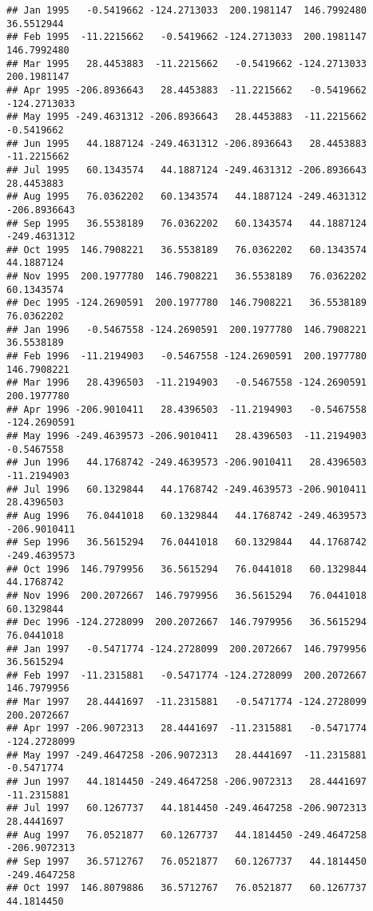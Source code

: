 \documentclass[]{article}
\begin{document}
\begin{verbatim}
## Jan 1995   -0.5419662 -124.2713033  200.1981147  146.7992480   36.5512944
## Feb 1995  -11.2215662   -0.5419662 -124.2713033  200.1981147  146.7992480
## Mar 1995   28.4453883  -11.2215662   -0.5419662 -124.2713033  200.1981147
## Apr 1995 -206.8936643   28.4453883  -11.2215662   -0.5419662 -124.2713033
## May 1995 -249.4631312 -206.8936643   28.4453883  -11.2215662   -0.5419662
## Jun 1995   44.1887124 -249.4631312 -206.8936643   28.4453883  -11.2215662
## Jul 1995   60.1343574   44.1887124 -249.4631312 -206.8936643   28.4453883
## Aug 1995   76.0362202   60.1343574   44.1887124 -249.4631312 -206.8936643
## Sep 1995   36.5538189   76.0362202   60.1343574   44.1887124 -249.4631312
## Oct 1995  146.7908221   36.5538189   76.0362202   60.1343574   44.1887124
## Nov 1995  200.1977780  146.7908221   36.5538189   76.0362202   60.1343574
## Dec 1995 -124.2690591  200.1977780  146.7908221   36.5538189   76.0362202
## Jan 1996   -0.5467558 -124.2690591  200.1977780  146.7908221   36.5538189
## Feb 1996  -11.2194903   -0.5467558 -124.2690591  200.1977780  146.7908221
## Mar 1996   28.4396503  -11.2194903   -0.5467558 -124.2690591  200.1977780
## Apr 1996 -206.9010411   28.4396503  -11.2194903   -0.5467558 -124.2690591
## May 1996 -249.4639573 -206.9010411   28.4396503  -11.2194903   -0.5467558
## Jun 1996   44.1768742 -249.4639573 -206.9010411   28.4396503  -11.2194903
## Jul 1996   60.1329844   44.1768742 -249.4639573 -206.9010411   28.4396503
## Aug 1996   76.0441018   60.1329844   44.1768742 -249.4639573 -206.9010411
## Sep 1996   36.5615294   76.0441018   60.1329844   44.1768742 -249.4639573
## Oct 1996  146.7979956   36.5615294   76.0441018   60.1329844   44.1768742
## Nov 1996  200.2072667  146.7979956   36.5615294   76.0441018   60.1329844
## Dec 1996 -124.2728099  200.2072667  146.7979956   36.5615294   76.0441018
## Jan 1997   -0.5471774 -124.2728099  200.2072667  146.7979956   36.5615294
## Feb 1997  -11.2315881   -0.5471774 -124.2728099  200.2072667  146.7979956
## Mar 1997   28.4441697  -11.2315881   -0.5471774 -124.2728099  200.2072667
## Apr 1997 -206.9072313   28.4441697  -11.2315881   -0.5471774 -124.2728099
## May 1997 -249.4647258 -206.9072313   28.4441697  -11.2315881   -0.5471774
## Jun 1997   44.1814450 -249.4647258 -206.9072313   28.4441697  -11.2315881
## Jul 1997   60.1267737   44.1814450 -249.4647258 -206.9072313   28.4441697
## Aug 1997   76.0521877   60.1267737   44.1814450 -249.4647258 -206.9072313
## Sep 1997   36.5712767   76.0521877   60.1267737   44.1814450 -249.4647258
## Oct 1997  146.8079886   36.5712767   76.0521877   60.1267737   44.1814450

\end{verbatim}
\end{document}
